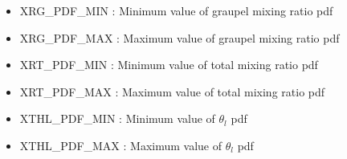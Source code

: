 \begin{itemize}
\item
XRG\_PDF\_MIN : Minimum value of graupel mixing ratio pdf

\item
XRG\_PDF\_MAX : Maximum value of graupel mixing ratio pdf

\item
XRT\_PDF\_MIN : Minimum value of total mixing ratio pdf

\item
XRT\_PDF\_MAX : Maximum value of total mixing ratio pdf

\item
XTHL\_PDF\_MIN : Minimum value of $\theta_l$ pdf

\item
XTHL\_PDF\_MAX : Maximum value of $\theta_l$ pdf

\end{itemize}

